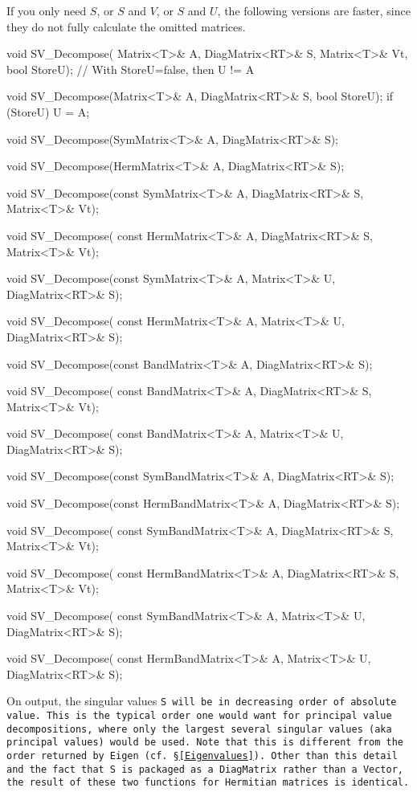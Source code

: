 If you only need $S$, or $S$ and $V$, or $S$ and $U$, the following 
versions are faster, since they do
not fully calculate the omitted matrices.  
\begin{tmvcode}
void SV_Decompose(
      Matrix<T>& A, DiagMatrix<RT>& S, Matrix<T>& Vt, bool StoreU);
// With StoreU=false, then U != A

void SV_Decompose(Matrix<T>& A, DiagMatrix<RT>& S, bool StoreU);
if (StoreU) U = A;

void SV_Decompose(SymMatrix<T>& A, DiagMatrix<RT>& S);

void SV_Decompose(HermMatrix<T>& A, DiagMatrix<RT>& S);
      
void SV_Decompose(const SymMatrix<T>& A, DiagMatrix<RT>& S, Matrix<T>& Vt);
      
void SV_Decompose(
      const HermMatrix<T>& A, DiagMatrix<RT>& S, Matrix<T>& Vt);
      
void SV_Decompose(const SymMatrix<T>& A, Matrix<T>& U, DiagMatrix<RT>& S);
      
void SV_Decompose(
      const HermMatrix<T>& A, Matrix<T>& U, DiagMatrix<RT>& S);
      
void SV_Decompose(const BandMatrix<T>& A, DiagMatrix<RT>& S);

void SV_Decompose(
      const BandMatrix<T>& A, DiagMatrix<RT>& S, Matrix<T>& Vt);
      
void SV_Decompose(
      const BandMatrix<T>& A, Matrix<T>& U, DiagMatrix<RT>& S);
      
void SV_Decompose(const SymBandMatrix<T>& A, DiagMatrix<RT>& S);
      
void SV_Decompose(const HermBandMatrix<T>& A, DiagMatrix<RT>& S);
      
void SV_Decompose(
      const SymBandMatrix<T>& A, DiagMatrix<RT>& S, Matrix<T>& Vt);

void SV_Decompose(
      const HermBandMatrix<T>& A, DiagMatrix<RT>& S, Matrix<T>& Vt);

void SV_Decompose(
      const SymBandMatrix<T>& A, Matrix<T>& U, DiagMatrix<RT>& S);

void SV_Decompose(
      const HermBandMatrix<T>& A, Matrix<T>& U, DiagMatrix<RT>& S);
\end{tmvcode}

On output, the singular values \tt{S} will be in decreasing order of absolute value.
This is the typical order one would want for principal value decompositions,
where only the largest several singular values (aka principal values) would be 
used.  Note that this is different from the order returned by \tt{Eigen}
(cf. \S\ref{Eigenvalues}).  Other than this detail and the fact that \tt{S}
is packaged as a \tt{DiagMatrix} rather than a \tt{Vector}, the result of these two
functions for Hermitian matrices is identical.

